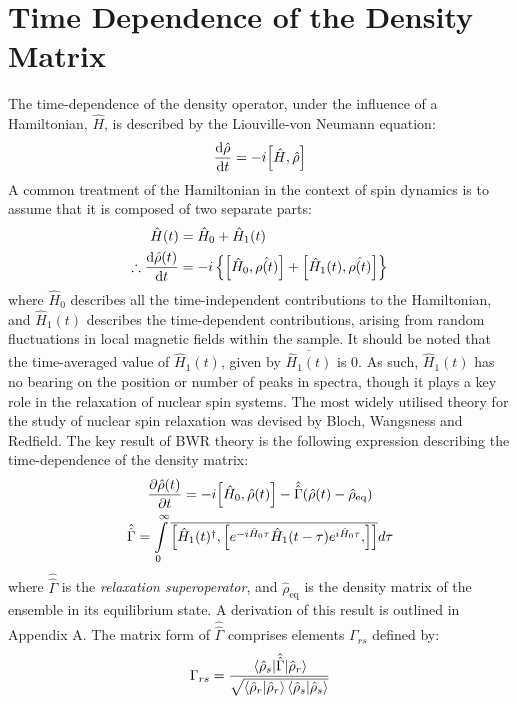 \section{Time Dependence of the Density Matrix}
The time-dependence of the density operator, under the influence of a Hamiltonian, $\hat{H}$, is described by the Liouville-von Neumann equation\cite{RN39}:
\begin{equation}
\dv{\hat{\rho}}{t}=-i\comm{\hat{H}}{\hat{\rho}}
\end{equation}
A common treatment of the Hamiltonian in the context of spin dynamics is to assume that it is composed of two separate parts:
\begin{equation}
\begin{split}
\hat{H} (t) &= \hat{H}_0 + \hat{H}_1 (t) \\
\therefore \dv{\hat{\rho} (t)}{t} &= -i \left\lbrace\comm{\hat{H}_0}{\hat{\rho (t)}} + \comm{\hat{H}_1 (t)}{\hat{\rho (t)}}\right\rbrace
\end{split}
\end{equation}
where $\hat{H}_0$ describes all the time-independent contributions to the Hamiltonian, and $\hat{H}_1 (t)$ describes the time-dependent contributions, arising from random fluctuations in local magnetic fields within the sample. It should be noted that the time-averaged value of $\hat{H}_1 (t)$, given by $\overline{\hat{H}_1(t)}$ is 0. As such, $\hat{H}_1 (t)$ has no bearing on the position or number of peaks in spectra, though it plays a key role in the relaxation of nuclear spin systems.
The most widely utilised theory for the study of nuclear spin relaxation was devised by Bloch, Wangsness and Redfield\cite{RN23,RN13}. The key result of BWR theory is the following expression describing the time-dependence of the density matrix: 
\begin{equation}
\label{superoperator}
\begin{gathered}
\pdv{\hat{\rho}(t)}{t} = -i \comm{\hat{H}_0}{\hat{\rho} (t)} - \hat{\hat{\Gamma}}(\hat{\rho} (t) - \hat{\rho}_{\text{eq}}) \\
\hat{\hat{\Gamma}} = \int \limits_0^{\infty} \overline{\comm{\hat{H}_1 (t)^{\dagger}}{\comm{e^{-i \hat{H}_0 \tau} \hat{H}_1 (t - \tau)  e^{i \hat{H}_0 \tau}}{}}} d \tau
\end{gathered}
\end{equation}
where $\hat{\hat{\Gamma}}$ is the \textit{relaxation superoperator},  and $\hat{\rho}_{\text{eq}}$ is the density matrix of the ensemble in its equilibrium state. A derivation of this result is outlined in Appendix A. The matrix form of $\hat{\hat{\Gamma}}$ comprises elements $\Gamma_{rs}$ defined by:
\begin{equation}
\Gamma_{rs} = \frac{\mel{\hat{\rho}_s}{\hat{\hat{\Gamma}}}{\hat{\rho}_r}}{\sqrt{\bra{\hat{\rho}_r} \ket{\hat{\rho}_r} \bra{\hat{\rho}_s} \ket{\hat{\rho}_s}}}
\end{equation}
